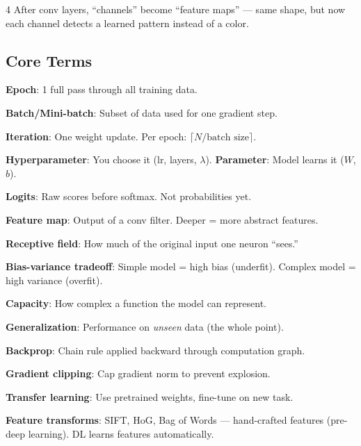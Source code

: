 \documentclass[6pt,landscape,a4paper]{extarticle}
\begin{document}
\begin{multicols}{4}
After conv layers, ``channels'' become ``feature maps'' --- same shape, but now each channel detects a learned pattern instead of a color.

\subsection{Core Terms}
\textbf{Epoch}: 1 full pass through all training data.

\textbf{Batch/Mini-batch}: Subset of data used for one gradient step.

\textbf{Iteration}: One weight update. Per epoch: $\lceil N/\text{batch size}\rceil$.

\textbf{Hyperparameter}: You choose it (lr, layers, $\lambda$). \textbf{Parameter}: Model learns it ($W$, $b$).

\textbf{Logits}: Raw scores before softmax. Not probabilities yet.

\textbf{Feature map}: Output of a conv filter. Deeper = more abstract features.

\textbf{Receptive field}: How much of the original input one neuron ``sees.''

\textbf{Bias-variance tradeoff}: Simple model = high bias (underfit). Complex model = high variance (overfit).

\textbf{Capacity}: How complex a function the model can represent.

\textbf{Generalization}: Performance on \textit{unseen} data (the whole point).

\textbf{Backprop}: Chain rule applied backward through computation graph.

\textbf{Gradient clipping}: Cap gradient norm to prevent explosion.

\textbf{Transfer learning}: Use pretrained weights, fine-tune on new task.

\textbf{Feature transforms}: SIFT, HoG, Bag of Words --- hand-crafted features (pre-deep learning). DL learns features automatically.

\end{multicols}
\end{document}
